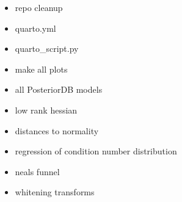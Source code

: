 \begin{itemize}
\item repo cleanup 
\item quarto.yml
\item quarto_script.py
\item make all plots 
\item all PosteriorDB models 
\item low rank hessian 
\item distances to normality 
\item regression of condition number distribution
\item neals funnel
\item whitening transforms
\end{itemize}